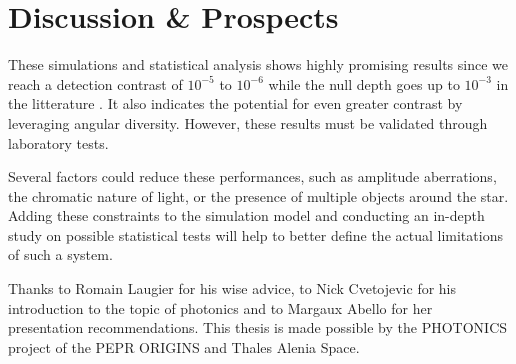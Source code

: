 \documentclass[]{spie}  %
\begin{document}
\section{Discussion \& Prospects}

These simulations and statistical analysis shows highly promising results since we reach a detection contrast of $10^{-5}$ to $10^{-6}$ while the null depth goes up to $10^{-3}$ in the litterature \cite{Cvetojevic et al. 2022}. It also indicates the potential for even greater contrast by leveraging angular diversity. However, these results must be validated through laboratory tests.

Several factors could reduce these performances, such as amplitude aberrations, the chromatic nature of light, or the presence of multiple objects around the star. Adding these constraints to the simulation model and conducting an in-depth study on possible statistical tests will help to better define the actual limitations of such a system.

\acknowledgments

Thanks to Romain Laugier for his wise advice, to Nick Cvetojevic for his introduction to the topic of photonics and to Margaux Abello for her presentation recommendations. This thesis is made possible by the PHOTONICS project of the PEPR ORIGINS and Thales Alenia Space.
\end{document}
